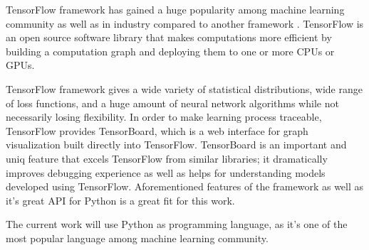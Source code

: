 TensorFlow framework has gained a huge popularity among machine learning
community as well as in industry compared to another framework \cite{DBLP:journals/corr/Goldsborough16}.
TensorFlow is an open source software library that makes computations more
efficient by building a computation graph and deploying them to one or more
CPUs or GPUs.


TensorFlow framework gives a wide variety of statistical distributions, wide
range of loss functions, and a huge amount of neural network algorithms while
not necessarily losing  flexibility. In order to make learning process traceable,
TensorFlow provides TensorBoard, which is a web interface for graph visualization
built directly into TensorFlow.
TensorBoard is an important and uniq feature that excels TensorFlow from similar
libraries; it dramatically improves debugging experience as well as helps
for understanding models developed using TensorFlow.
Aforementioned features of the framework as well
as it's great API for Python is a great fit for this work.

The current work will use Python as programming language, as it's one of
the most popular language among machine learning community.


